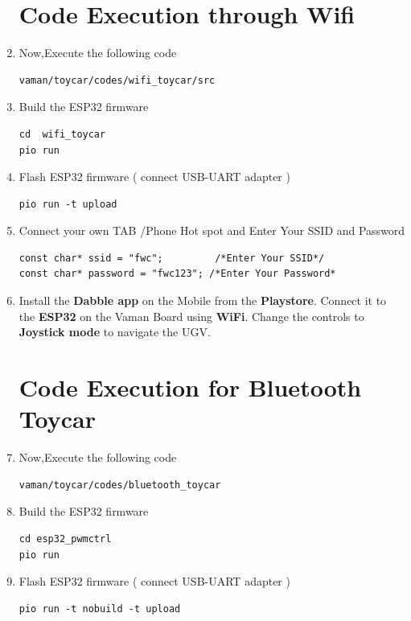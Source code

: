 \begin{enumerate}[label=\thesection.\arabic*.,ref=\thesection.\theenumi]
\section{Code Execution through Wifi}
\raggedright
\item Now,Execute the following code
\begin{lstlisting}
vaman/toycar/codes/wifi_toycar/src
\end{lstlisting}

\item Build the ESP32 firmware
\begin{lstlisting}
cd  wifi_toycar
pio run
\end{lstlisting} 

\item Flash ESP32 firmware ( connect USB-UART adapter )
\begin{lstlisting}
pio run -t upload
\end{lstlisting} 

\item Connect your own TAB /Phone Hot spot and  Enter Your SSID and  Password
\begin{lstlisting}
const char* ssid = "fwc";         /*Enter Your SSID*/ 
const char* password = "fwc123"; /*Enter Your Password*
\end{lstlisting} 
\item Install the \textbf{Dabble app} on the Mobile from the \textbf{Playstore}. Connect it to the \textbf{ESP32} on the Vaman Board using \textbf{WiFi}. Change the controls to \textbf{Joystick mode} to navigate the UGV.\\

\section{Code Execution for Bluetooth Toycar}
\raggedright
\item Now,Execute the following code 

\begin{lstlisting}
vaman/toycar/codes/bluetooth_toycar
\end{lstlisting}

\item Build the ESP32 firmware
\begin{lstlisting}
cd esp32_pwmctrl
pio run
\end{lstlisting} 

\item Flash ESP32 firmware ( connect USB-UART adapter )
\begin{lstlisting}
pio run -t nobuild -t upload
\end{lstlisting} 


\end{enumerate}
